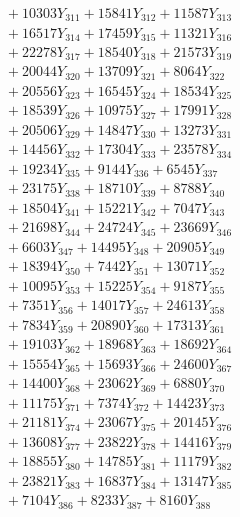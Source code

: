 \documentclass[a4paper,10pt]{article}
\begin{document}
{\begin{align}
&\;  + 10303 Y_{311} + 15841 Y_{312} + 11587 Y_{313} \\[0.3ex]
&\;  + 16517 Y_{314} + 17459 Y_{315} + 11321 Y_{316} \\[0.3ex]
&\;  + 22278 Y_{317} + 18540 Y_{318} + 21573 Y_{319} \\[0.3ex]
&\;  + 20044 Y_{320} + 13709 Y_{321} + 8064 Y_{322} \\[0.3ex]
&\;  + 20556 Y_{323} + 16545 Y_{324} + 18534 Y_{325} \\[0.3ex]
&\;  + 18539 Y_{326} + 10975 Y_{327} + 17991 Y_{328} \\[0.5ex]\allowbreak
&\;  + 20506 Y_{329} + 14847 Y_{330} + 13273 Y_{331} \\[0.3ex]
&\;  + 14456 Y_{332} + 17304 Y_{333} + 23578 Y_{334} \\[0.3ex]
&\;  + 19234 Y_{335} + 9144 Y_{336} + 6545 Y_{337} \\[0.3ex]
&\;  + 23175 Y_{338} + 18710 Y_{339} + 8788 Y_{340} \\[0.3ex]
&\;  + 18504 Y_{341} + 15221 Y_{342} + 7047 Y_{343} \\[0.3ex]
&\;  + 21698 Y_{344} + 24724 Y_{345} + 23669 Y_{346} \\[0.3ex]
&\;  + 6603 Y_{347} + 14495 Y_{348} + 20905 Y_{349} \\[0.3ex]
&\;  + 18394 Y_{350} + 7442 Y_{351} + 13071 Y_{352} \\[0.3ex]
&\;  + 10095 Y_{353} + 15225 Y_{354} + 9187 Y_{355} \\[0.3ex]
&\;  + 7351 Y_{356} + 14017 Y_{357} + 24613 Y_{358} \\[0.5ex]\allowbreak
&\;  + 7834 Y_{359} + 20890 Y_{360} + 17313 Y_{361} \\[0.3ex]
&\;  + 19103 Y_{362} + 18968 Y_{363} + 18692 Y_{364} \\[0.3ex]
&\;  + 15554 Y_{365} + 15693 Y_{366} + 24600 Y_{367} \\[0.3ex]
&\;  + 14400 Y_{368} + 23062 Y_{369} + 6880 Y_{370} \\[0.3ex]
&\;  + 11175 Y_{371} + 7374 Y_{372} + 14423 Y_{373} \\[0.3ex]
&\;  + 21181 Y_{374} + 23067 Y_{375} + 20145 Y_{376} \\[0.3ex]
&\;  + 13608 Y_{377} + 23822 Y_{378} + 14416 Y_{379} \\[0.3ex]
&\;  + 18855 Y_{380} + 14785 Y_{381} + 11179 Y_{382} \\[0.3ex]
&\;  + 23821 Y_{383} + 16837 Y_{384} + 13147 Y_{385} \\[0.3ex]
&\;  + 7104 Y_{386} + 8233 Y_{387} + 8160 Y_{388} \\[0.5ex]\allowbreak

\end{align}}
\end{document}
